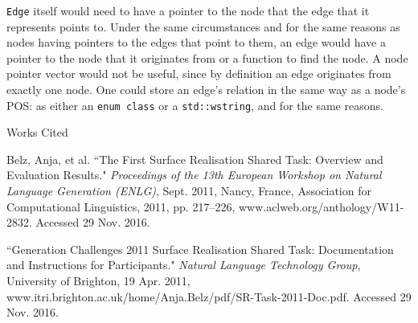 \documentclass[12pt,letterpaper]{article}
\newenvironment{workscited}{
  \newcommand{\bibentry}{\noindent{}\hangindent=0.5in}
  \newpage{}
  {\centering{}Works Cited\par{}}
}{\newpage{}}
\begin{document}
\begin{flushleft}
  \texttt{Edge} itself would need to have a pointer to the node that the edge that it represents points to. Under the same circumstances and for the same reasons as nodes having pointers to the edges that point to them, an edge would have a pointer to the node that it originates from or a function to find the node. A node pointer vector would not be useful, since by definition an edge originates from exactly one node. One could store an edge's relation in the same way as a node's POS: as either an \texttt{enum class} or a \texttt{std::wstring}, and for the same reasons.
  \begin{workscited}
    \bibentry{}Belz, Anja, et al. ``The First Surface Realisation Shared Task: Overview and Evaluation Results." \textit{Proceedings of the 13th European Workshop on Natural Language Generation (ENLG)}, Sept. 2011, Nancy, France, Association for Computational Linguistics, 2011, pp. 217--226, www.aclweb.org/anthology/W11-2832. Accessed 29 Nov. 2016.

    \bibentry{}``Generation Challenges 2011 Surface Realisation Shared Task: Documentation and Instructions for Participants." \textit{Natural Language Technology Group}, University of Brighton, 19 Apr. 2011, www.itri.brighton.ac.uk/home/Anja.Belz/pdf/SR-Task-2011-Doc.pdf. Accessed 29 Nov. 2016.
  \end{workscited}
\end{flushleft}
\end{document}
